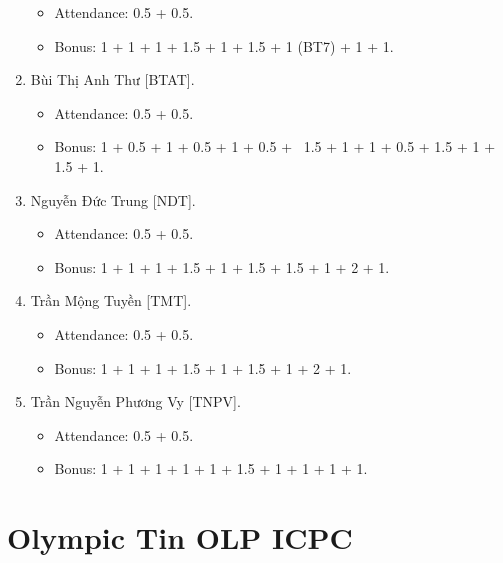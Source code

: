 \documentclass{article}
\begin{document}
\begin{enumerate}
    \begin{itemize}
        \item Attendance: 0.5 + 0.5.
        \item Bonus: 1 + 1 + 1 + 1.5 + 1 + 1.5 + 1 (BT7) + 1 + 1.
    \end{itemize}
    \item {\sc Bùi Thị Anh Thư [BTAT].}
    \begin{itemize}
        \item Attendance: 0.5 + 0.5.
        \item Bonus: 1 + 0.5 + 1 + 0.5 + 1 + 0.5 +  1.5 + 1 + 1 + 0.5 + 1.5 + 1 + 1.5 + 1.
    \end{itemize}
    \item {\sc Nguyễn Đức Trung [NDT].}
    \begin{itemize}
        \item Attendance: 0.5 + 0.5.
        \item Bonus: 1 + 1 + 1 + 1.5 + 1 + 1.5 + 1.5 + 1 + 2 + 1.
    \end{itemize}
    \item {\sc Trần Mộng Tuyền [TMT].}
    \begin{itemize}
        \item Attendance: 0.5 + 0.5.
        \item Bonus: 1 + 1 + 1 + 1.5 + 1 + 1.5 + 1 + 2 + 1.
    \end{itemize}
    \item {\sc Trần Nguyễn Phương Vy [TNPV].}
    \begin{itemize}
        \item Attendance: 0.5 + 0.5.
        \item Bonus: 1 + 1 + 1 + 1 + 1 + 1.5 + 1 + 1 + 1 + 1.
    \end{itemize}
\end{enumerate}


\section{Olympic Tin OLP ICPC}
\end{document}
